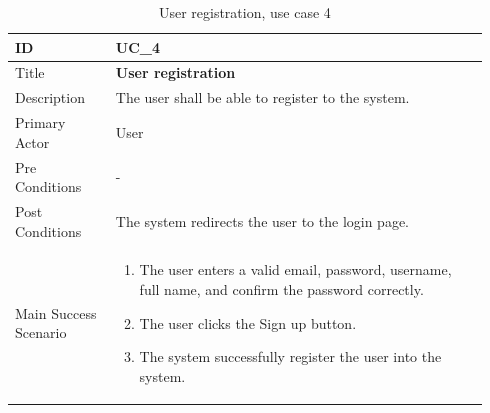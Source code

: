 \documentclass{scrartcl}
\begin{document}
\begin{table}[H]
  \caption{User registration, use case 4}
  \begin{tabular}{p{0.20\linewidth} | p{0.74\linewidth}}
    \toprule
    ID & UC\_4
    \\\midrule
    Title & \textbf{User registration}
    \\\hline
    Description & The user shall be able to register to the system.
    \\\hline
    Primary Actor & User
    \\\hline
    Pre Conditions & -
    \\\hline
    Post Conditions & The system redirects the user to the login page.
    \\\hline
    Main Success Scenario & {
                            \begin{enumerate}
                            \item The user enters a valid email, password, username, full name, and confirm the password correctly.
                            \item The user clicks the Sign up button.
                            \item The system successfully register the user into the system.
                            \end{enumerate}
                            }\vspace*{-\baselineskip}
    \\\bottomrule
  \end{tabular}
\end{table}
\end{document}
